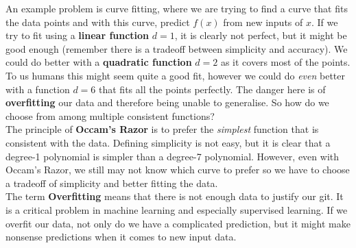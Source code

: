 \documentclass{article}
\newcommand{\n}[0]{\\[\baselineskip]}
\begin{document}
\noindent
An example problem is curve fitting, where we are trying to find a curve that fits the data points and with this curve, predict $f(x)$ from new inputs of $x$. If we try to fit using a \textbf{linear function} $d = 1$, it is clearly not perfect, but it might be good enough (remember there is a tradeoff between simplicity and accuracy). We could do better with a \textbf{quadratic function} $d = 2$ as it covers most of the points. To us humans this might seem quite a good fit, however we could do \textit{even} better with a function $d = 6$ that fits all the points perfectly. The danger here is of \textbf{overfitting} our data and therefore being unable to generalise. So how do we choose from among multiple consistent functions?
\n
The principle of \textbf{Occam's Razor} is to prefer the \textit{simplest} function that is consistent with the data. Defining simplicity is not easy, but it is clear that a degree-1 polynomial is simpler than a degree-7 polynomial. However, even with Occam's Razor, we still may not know which curve to prefer so we have to choose a tradeoff of simplicity and better fitting the data. 
\n
The term \textbf{Overfitting} means that there is not enough data to justify our git. It is a critical problem in machine learning and especially supervised learning. If we overfit our data, not only do we have a complicated prediction, but it might make nonsense predictions when it comes to new input data. 
\end{document}
